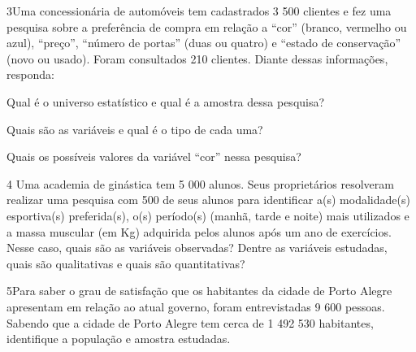 \num{3}Uma concessionária de automóveis tem cadastrados 3 500 clientes e
fez uma pesquisa sobre a preferência de compra em relação a ``cor''
(branco, vermelho ou azul), ``preço'', ``número de portas'' (duas ou
quatro) e ``estado de conservação'' (novo ou usado). Foram consultados
210 clientes. Diante dessas informações, responda:

\begin{escolha}
\item
  Qual é o universo estatístico e qual é a amostra dessa pesquisa?


\item
  Quais são as variáveis e qual é o tipo de cada uma?


\item
  Quais os possíveis valores da variável ``cor'' nessa pesquisa?

\end{escolha}


\num{4} Uma academia de ginástica tem 5 000 alunos. Seus proprietários
resolveram realizar uma pesquisa com 500 de seus alunos para identificar
a(s) modalidade(s) esportiva(s) preferida(s), o(s) período(s) (manhã,
tarde e noite) mais utilizados e a massa muscular (em Kg) adquirida
pelos alunos após um ano de exercícios. Nesse caso, quais são as
variáveis observadas? Dentre as variáveis estudadas, quais são
qualitativas e quais são quantitativas?



\num{5}Para saber o grau de satisfação que os habitantes da cidade de Porto
Alegre apresentam em relação ao atual governo, foram entrevistadas 9 600
pessoas. Sabendo que a cidade de Porto Alegre tem cerca de 1 492 530
habitantes, identifique a população e amostra estudadas.


